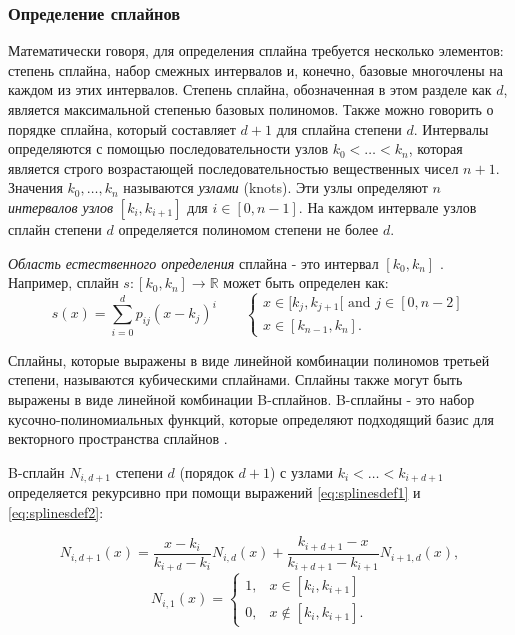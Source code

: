 \subsubsection{Определение сплайнов}
Математически говоря, для определения сплайна требуется несколько элементов: степень сплайна, набор смежных интервалов и, конечно, базовые многочлены на каждом из этих интервалов.
Степень сплайна, обозначенная в этом разделе как $ d $, является максимальной степенью базовых полиномов.
Также можно говорить о порядке сплайна, который составляет $ d + 1 $ для сплайна степени $ d $.
Интервалы определяются с помощью последовательности узлов $ k_0 <\ldots <k_n $, которая является строго возрастающей последовательностью вещественных чисел $ n + 1 $.
Значения $ k_0, \ldots, k_n $ называются \emph{узлами} (knots).
Эти узлы определяют $ n $ \emph{интервалов узлов} $ [k_i, k_ {i + 1}] $ для $ i \in [0, n-1] $.
На каждом интервале узлов сплайн степени $ d $ определяется полиномом степени не более $ d $.

\emph{Область естественного определения} сплайна - это интервал $ [k_0, k_n] $ \cite{Splines}.
Например, сплайн $s: [k_0, k_n] \rightarrow \mathbb {R} $ может быть определен как:
\begin{equation}
    s(x) =
    \sum_{i=0}^d p_{ij} (x - k_j)^i \qquad
    \begin{cases}
        x \in [k_j,k_{j+1}[ \textrm{ and } j \in [ 0,n-2 ] \\
        x \in [k_{n-1},k_n].
    \end{cases}
    \end{equation}

Сплайны, которые выражены в виде линейной комбинации полиномов третьей степени, называются кубическими сплайнами.
Сплайны также могут быть выражены в виде линейной комбинации B-сплайнов.
B-сплайны - это набор кусочно-полиномиальных функций, которые определяют подходящий базис для векторного пространства сплайнов \cite{Splines}.

B-сплайн $N_{i, d + 1} $ степени $ d $ (порядок $ d + 1 $) с узлами $ k_i < \ldots <k_ {i + d + 1} $ определяется рекурсивно при помощи выражений \ref{eq:splinesdef1} и \ref{eq:splinesdef2}:

\begin{equation} \label{eq:splinesdef1}
    N_{i,d+1}(x) = \frac{x - k_i}{k_{i+d} - k_i} N_{i,d}(x) + \frac{k_{i+d+1} - x}{k_{i+d+1} - k_{i+1}} N_{i+1,d}(x),
    \end{equation}
    \begin{equation} \label{eq:splinesdef2}
    N_{i,1}(x)= 
    \begin{cases} 
    1, & x \in [k_i,k_{i+1}] \\ 
    0, & x \notin [k_i,k_{i+1}].
    \end{cases}
    \end{equation}

